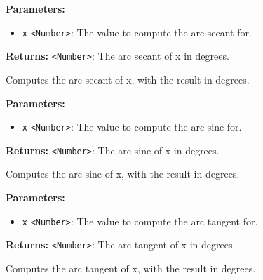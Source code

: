 \documentclass[12pt,a4paper]{article}
\begin{document}
\vspace{5mm}
\noindent {}


\noindent \textbf{Parameters:}
\begin{itemize}
  \item \texttt{x} \texttt{<Number>}: The value to compute the arc secant for.
\end{itemize}

\noindent \textbf{Returns:} \texttt{<Number>}: The arc secant of x in degrees.

\noindent Computes the arc secant of x, with the result in degrees.

\vspace{5mm}
\noindent {}


\noindent \textbf{Parameters:}
\begin{itemize}
  \item \texttt{x} \texttt{<Number>}: The value to compute the arc sine for.
\end{itemize}

\noindent \textbf{Returns:} \texttt{<Number>}: The arc sine of x in degrees.

\noindent Computes the arc sine of x, with the result in degrees.

\vspace{5mm}
\noindent {}


\noindent \textbf{Parameters:}
\begin{itemize}
  \item \texttt{x} \texttt{<Number>}: The value to compute the arc tangent for.
\end{itemize}

\noindent \textbf{Returns:} \texttt{<Number>}: The arc tangent of x in degrees.

\noindent Computes the arc tangent of x, with the result in degrees.

\vspace{5mm}
\noindent {}
\end{document}
